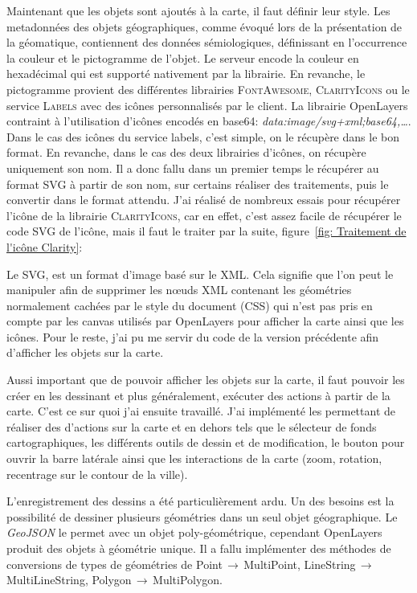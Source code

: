 \documentclass{rapportUHA40}
\begin{document}
Maintenant que les objets sont ajoutés à la carte, il faut définir leur style.
Les metadonnées des objets géographiques, comme évoqué lors de la présentation
de la géomatique, contiennent des données sémiologiques, définissant en
l'occurrence la couleur et le pictogramme de l'objet. Le serveur encode la
couleur en hexadécimal qui est supporté nativement par la librairie. En
revanche, le pictogramme provient des différentes librairies
\textsc{FontAwesome}, \textsc{ClarityIcons} ou le service \textsc{Labels} avec
des icônes personnalisés par le client. La librairie OpenLayers contraint à
l'utilisation d'icônes encodés en base64:
\textit{data:image/svg+xml;base64,\ldots}. Dans le cas des icônes du service
labels, c'est simple, on le récupère dans le bon format. En revanche, dans le
cas des deux librairies d'icônes, on récupère uniquement son nom. Il a donc
fallu dans un premier temps le récupérer au format SVG à partir de son nom, sur
certains réaliser des traitements, puis le convertir dans le format attendu.
J'ai réalisé de nombreux essais pour récupérer l'icône de la librairie
\textsc{ClarityIcons}, car en effet, c'est assez facile de récupérer le code
SVG de l'icône, mais il faut le traiter par la suite, figure~\ref{fig:
  Traitement de l'icône Clarity}:

Le SVG, est un format d'image basé sur le XML\@. Cela signifie que l'on peut le
manipuler afin de supprimer les nœuds XML contenant les géométries normalement
cachées par le style du document (CSS) qui n'est pas pris en compte par les
canvas utilisés par OpenLayers pour afficher la carte ainsi que les icônes.
Pour le reste, j'ai pu me servir du code de la version précédente afin
d'afficher les objets sur la carte.

Aussi important que de pouvoir afficher les objets sur la carte, il faut
pouvoir les créer en les dessinant et plus généralement, exécuter des actions à
partir de la carte. C'est ce sur quoi j'ai ensuite travaillé. J'ai implémenté
les  \fg{} permettant de réaliser des d'actions sur la
carte et en dehors tels que le sélecteur de fonds cartographiques, les
différents outils de dessin et de modification, le bouton pour ouvrir la barre
latérale ainsi que les interactions de la carte (zoom, rotation, recentrage sur
le contour de la ville).

L'enregistrement des dessins a été particulièrement ardu. Un des besoins est la
possibilité de dessiner plusieurs géométries dans un seul objet géographique.
Le \textit{GeoJSON} le permet avec un objet poly-géométrique, cependant
OpenLayers produit des objets à géométrie unique. Il a fallu implémenter des
méthodes de conversions de types de géométries de Point$\,\to\,$MultiPoint,
LineString$\,\to\,$MultiLineString, Polygon$\,\to\,$MultiPolygon.
\end{document}
